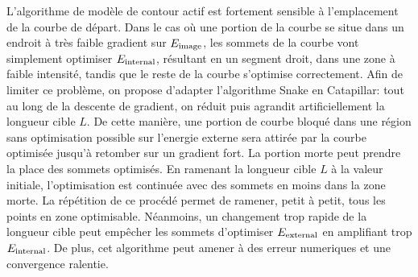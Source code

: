 L'algorithme de modèle de contour actif est fortement sensible à l'emplacement de la courbe de départ. Dans le cas où une portion de la courbe se situe dans un endroit à très faible gradient sur $E_{\text{image}}$, les sommets de la courbe vont simplement optimiser $E_{\text{internal}}$, résultant en un segment droit, dans une zone à faible intensité, tandis que le reste de la courbe s'optimise correctement.
Afin de limiter ce problème, on propose d'adapter l'algorithme Snake en Catapillar: tout au long de la descente de gradient, on réduit puis agrandit artificiellement la longueur cible $L$. De cette manière, une portion de courbe bloqué dans une région sans optimisation possible sur l'energie externe sera attirée par la courbe optimisée jusqu'à retomber sur un gradient fort. La portion morte peut prendre la place des sommets optimisés. En ramenant la longueur cible $L$ à la valeur initiale, l'optimisation est continuée avec des sommets en moins dans la zone morte. La répétition de ce procédé permet de ramener, petit à petit, tous les points en zone optimisable. Néanmoins, un changement trop rapide de la longueur cible peut empêcher les sommets d'optimiser $E_{\text{external}}$ en amplifiant trop $E_{\text{internal}}$. De plus, cet algorithme peut amener à des erreur numeriques et une convergence ralentie.


